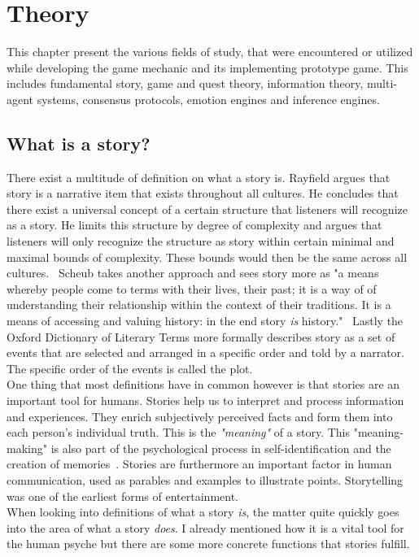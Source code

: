 \chapter{Theory} %
This chapter present the various fields of study, that were encountered or utilized while developing the game mechanic and its implementing prototype game. This includes fundamental story, game and quest theory, information theory, multi-agent systems, consensus protocols, emotion engines and inference engines.
\section{What is a story?}
There exist a multitude of definition on what a story is. Rayfield argues that story is a narrative item that exists throughout all cultures. He concludes that there exist a universal concept of a certain structure that listeners will recognize as a story. He limits this structure by degree of complexity and argues that listeners will only recognize the structure as story within certain minimal and maximal bounds of complexity. These bounds would then be the same across all cultures.~\cite{Rayfield1972} Scheub takes another approach and sees story more as "a means whereby people come to terms with their lives, their past; it is a way of of understanding their relationship within the context of their traditions. It is a means of accessing and valuing history: in the end story \textit{is} history."~\cite{Scheub1998} Lastly the Oxford Dictionary of Literary Terms more formally describes story as a set of events that are selected and arranged in a specific order and told by a narrator. The specific order of the events is called the plot.~\cite{Baldick1996}\\
One thing that most definitions have in common however is that stories are an important tool for humans. Stories help us to interpret and process information and experiences. They enrich subjectively perceived facts and form them into each person's individual truth. This is the \textit{"meaning"} of a story. This "meaning-making" is also part of the psychological process in self-identification and the creation of memories~\cite{Flanagan1992}. Stories are furthermore an important factor in human communication, used as parables and examples to illustrate points. Storytelling was one of the earliest forms of entertainment.\\
When looking into definitions of what a story \textit{is}, the matter quite quickly goes into the area of what a story \textit{does}. I already mentioned how it is a vital tool for the human psyche but there are some more concrete functions that stories fulfill.
